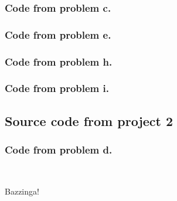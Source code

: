 \documentclass{article}
\begin{document}
\subsubsection*{Code from problem c.}

\hypertarget{code_problem_c}{}



\subsubsection*{Code from problem e.}

\hypertarget{code_problem_e}{}



\subsubsection*{Code from problem h.}

\hypertarget{code_problem_h}{}



\subsubsection*{Code from problem i.}

\hypertarget{code_problem_i}{}



\subsection*{Source code from project 2}

\subsubsection*{Code from problem d.}

\hypertarget{code_problem_d}{}



\

\bigskip
\bigskip
\bigskip
\bigskip

\begin{center}
Bazzinga!
\end{center}
\end{document}
